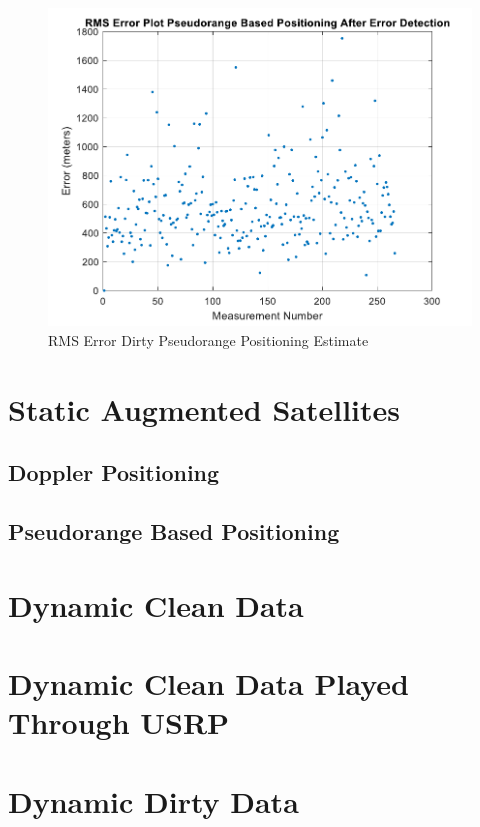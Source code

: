 \documentclass[12pt]{report}
\begin{document}
\begin{figure}[h!]
    \centering
    \includegraphics[width=5in]
    {15min_irid_dirty_pseudo_rmse.pdf}
    \caption{RMS Error Dirty Pseudorange Positioning Estimate}
    \label{fig:DirtyPseudorange15minIridPositrmse}
\end{figure}

\section{Static Augmented Satellites}

\subsection{Doppler Positioning}

\subsection{Pseudorange Based Positioning}

\section{Dynamic Clean Data}

\section{Dynamic Clean Data Played Through USRP}

\section{Dynamic Dirty Data}
\end{document}
